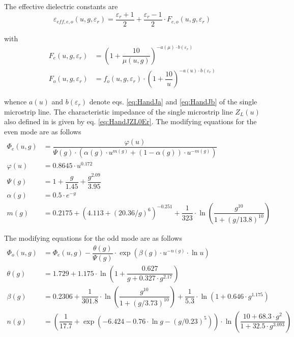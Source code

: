 The effective dielectric constants are
\begin{equation}
\varepsilon_{eff,e,o}\left(u,g,\varepsilon_r\right) = \dfrac{\varepsilon_r+1}{2} + \dfrac{\varepsilon_r-1}{2}\cdot F_{e,o}\left(u,g,\varepsilon_r\right)
\end{equation}

with
\begin{align}
F_{e}\left(u,g,\varepsilon_r\right) &= \left(1+\dfrac{10}{\mu\left(u,g\right)}\right)^{-a(\mu)\cdot b\left(\varepsilon_r\right)}\\
F_{o}\left(u,g,\varepsilon_r\right) &= f_o\left(u,g,\varepsilon_r\right)\cdot \left(1+\dfrac{10}{u}\right)^{-a\left(u\right)\cdot b\left(\varepsilon_r\right)}
\end{align}

whence $a(u)$ and $b\left(\varepsilon_r\right)$ denote
eqs. \eqref{eq:HandJa} and \eqref{eq:HandJb} of the single microstrip
line.  The characteristic impedance of the single microstrip line
$Z_L\left(u\right)$ also defined in \cite{Hammerstad} is given by
eq. \eqref{eq:HandJZL0Er}.  The modifying equations for the even mode
are as follows
\begin{align}
\Phi_e\left(u,g\right) &= \dfrac{\varphi(u)}{\Psi(g)\cdot \left(\alpha(g)\cdot u^{m(g)} +\left(1-\alpha(g)\right)\cdot u^{-m(g)}\right)}\\
\varphi(u) &= 0.8645\cdot u^{0.172}\\
\Psi(g) &= 1 + \dfrac{g}{1.45} + \dfrac{g^{2.09}}{3.95}\\
\alpha(g) &= 0.5\cdot e^{-g}\\
m(g) &= 0.2175+\left(4.113+\left(20.36/g\right)^6\right)^{-0.251} +\dfrac{1}{323}\cdot\ln{\left(\dfrac{g^{10}}{1+\left(g/13.8\right)^{10}}\right)}
\end{align}

The modifying equations for the odd mode are as follows
\begin{align}
\Phi_o\left(u,g\right) &= \Phi_e\left(u,g\right)-\dfrac{\theta(g)}{\Psi(g)}\cdot \exp{\left(\beta(g)\cdot u^{-n(g)}\cdot\ln{u}\right)}\\
\theta(g) &= 1.729+1.175\cdot\ln{\left(1+\dfrac{0.627}{g+0.327\cdot g^{2.17}}\right)}\\
\beta(g) &= 0.2306+\dfrac{1}{301.8}\cdot\ln{\left(\dfrac{g^{10}}{1+\left(g/3.73\right)^{10}}\right)} +\dfrac{1}{5.3}\cdot\ln{\left(1+0.646\cdot g^{1.175}\right)}\\
n(g) &= \left(\dfrac{1}{17.7} + \exp{\left(-6.424 - 0.76\cdot \ln{g} - \left(g/0.23\right)^5\right)}\right)\cdot \ln{\left(\dfrac{10 + 68.3\cdot g^2}{1+32.5\cdot g^{3.093}}\right)}
\end{align}

